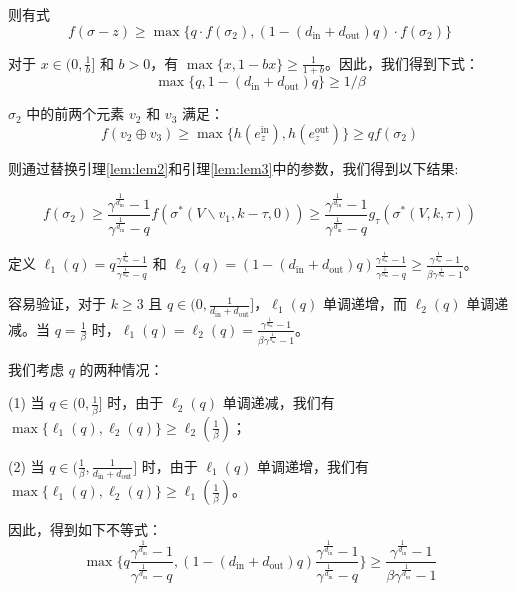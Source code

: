则有式
\begin{equation}
    f(\sigma-z)\ge \max\{ q \cdot f(\sigma_2),(1-(d_{\text{in}} + d_{\text{out}})q) \cdot f(\sigma_2)\} \label{equ:tau1_ine1}
\end{equation}

对于 $x\in (0,\frac{1}{b}]$ 和 $b>0$，有 $\max\{x,1-bx\} \ge \frac{1}{1+b}$。因此，我们得到下式：
\begin{equation}
    \max\{q,1-(d_{\text{in}} + d_{\text{out}})q\} \ge 1/\beta
\end{equation}

$\sigma_2$ 中的前两个元素 $v_2$ 和 $v_3$ 满足：
\begin{equation}
f(v_2\oplus v_3) \ge \max \{h(e_z^{\text{in}}),h(e_z^{\text{out}})\} \ge q f(\sigma_2) \label{equ:tau1_ine2}
\end{equation}

则通过替换引理\ref{lem:lem2}和引理\ref{lem:lem3}中的参数，我们得到以下结果:

\begin{equation}
    f(\sigma_2) \ge \frac{\gamma^{\frac{1}{d_{\text{in}}}}-1}{\gamma^{\frac{1}{d_{\text{in}}}}-q} f(\sigma^*(V\backslash v_1,k-\tau,0)) \ge \frac{\gamma^{\frac{1}{d_{\text{in}}}}-1}{\gamma^{\frac{1}{d_{\text{in}}}}-q} g_{\tau} (\sigma^*(V,k,\tau)) \label{equ:tau1_ine3}
\end{equation}

定义 $\ell_1(q) = q \frac{\gamma^{\frac{1}{d_{\text{in}}}}-1}{\gamma^{\frac{1}{d_{\text{in}}}}-q}$ 和 $\ell_2(q) = (1-(d_{\text{in}} + d_{\text{out}})q) \frac{\gamma^{\frac{1}{d_{\text{in}}}}-1}{\gamma^{\frac{1}{d_{\text{in}}}}-q} \ge \frac{\gamma^{\frac{1}{d_{\text{in}}}}-1}{\beta \gamma^{\frac{1}{d_{\text{in}}}}-1}$。

容易验证，对于 $k\ge 3$ 且 $q\in (0,\frac{1}{d_{\text{in}}+d_{\text{out}}}]$，$\ell_1(q)$ 单调递增，而 $\ell_2(q)$ 单调递减。当 $q=\frac{1}{\beta}$ 时，$\ell_1(q)=\ell_2(q)=\frac{\gamma^{\frac{1}{d_{\text{in}}}}-1}{\beta \gamma^{\frac{1}{d_{\text{in}}}}-1}$。

我们考虑 $q$ 的两种情况：

(1) 当 $q \in (0,\frac{1}{\beta}]$ 时，由于 $\ell_2(q)$ 单调递减，我们有 $\max\{\ell_1(q),\ell_2(q)\}\ge \ell_2(\frac{1}{\beta})$；

(2) 当 $q \in (\frac{1}{\beta},\frac{1}{d_{\text{in}}+d_{\text{out}}}]$ 时，由于 $\ell_1(q)$ 单调递增，我们有 $\max\{\ell_1(q),\ell_2(q)\}\ge \ell_1(\frac{1}{\beta})$。

因此，得到如下不等式：
\begin{equation}
    \max\{ q \frac{\gamma^{\frac{1}{d_{\text{in}}}}-1}{\gamma^{\frac{1}{d_{\text{in}}}}-q} , (1-(d_{\text{in}} + d_{\text{out}})q) \frac{\gamma^{\frac{1}{d_{\text{in}}}}-1}{\gamma^{\frac{1}{d_{\text{in}}}}-q} \} \ge \frac{\gamma^{\frac{1}{d_{\text{in}}}}-1}{\beta \gamma^{\frac{1}{d_{\text{in}}}}-1} \label{equ:tau1_ine4}    
\end{equation}

